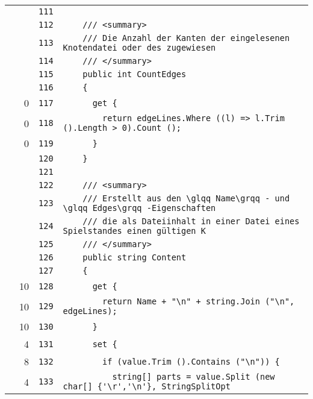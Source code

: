 \documentclass[a4paper,10pt]{article}
\begin{document}
\begin{longtable}[l]{lrrl}
\cellcolor{gray} &  & \verb~111~ & \verb~~\\
\cellcolor{gray} &  & \verb~112~ & \verb~    /// <summary>~\\
\cellcolor{gray} &  & \verb~113~ & \verb~    /// Die Anzahl der Kanten der eingelesenen Knotendatei oder des zugewiesen~\\
\cellcolor{gray} &  & \verb~114~ & \verb~    /// </summary>~\\
\cellcolor{gray} &  & \verb~115~ & \verb~    public int CountEdges~\\
\cellcolor{gray} &  & \verb~116~ & \verb~    {~\\
\cellcolor{red} & 0 & \verb~117~ & \verb~      get {~\\
\cellcolor{red} & 0 & \verb~118~ & \verb~        return edgeLines.Where ((l) => l.Trim ().Length > 0).Count ();~\\
\cellcolor{red} & 0 & \verb~119~ & \verb~      }~\\
\cellcolor{gray} &  & \verb~120~ & \verb~    }~\\
\cellcolor{gray} &  & \verb~121~ & \verb~~\\
\cellcolor{gray} &  & \verb~122~ & \verb~    /// <summary>~\\
\cellcolor{gray} &  & \verb~123~ & \verb~    /// Erstellt aus den \glqq Name\grqq - und \glqq Edges\grqq -Eigenschaften~\\
\cellcolor{gray} &  & \verb~124~ & \verb~    /// die als Dateiinhalt in einer Datei eines Spielstandes einen gültigen K~\\
\cellcolor{gray} &  & \verb~125~ & \verb~    /// </summary>~\\
\cellcolor{gray} &  & \verb~126~ & \verb~    public string Content~\\
\cellcolor{gray} &  & \verb~127~ & \verb~    {~\\
\cellcolor{green} & 10 & \verb~128~ & \verb~      get {~\\
\cellcolor{green} & 10 & \verb~129~ & \verb~        return Name + "\n" + string.Join ("\n", edgeLines);~\\
\cellcolor{green} & 10 & \verb~130~ & \verb~      }~\\
\cellcolor{green} & 4 & \verb~131~ & \verb~      set {~\\
\cellcolor{green} & 8 & \verb~132~ & \verb~        if (value.Trim ().Contains ("\n")) {~\\
\cellcolor{green} & 4 & \verb~133~ & \verb~          string[] parts = value.Split (new char[] {'\r','\n'}, StringSplitOpt~\\

\end{longtable}
\end{document}
